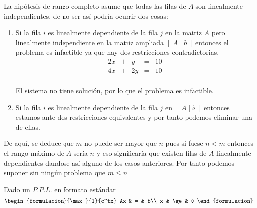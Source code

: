 La hipótesis de rango completo asume que todas las filas de $A$ son
linealmente independientes. de no ser así podría ocurrir dos cosas:

\begin{enumerate}
  \item Si la fila $i$ es linealmente dependiente de la fila $j$ en la
  matriz $A$ pero linealmente independiente en la matriz ampliada
  $[\;A\;|\;b\;]$ entonces el problema es infactible ya  que hay dos
  restricciones contradictorias.
  $$
  \begin{array}{rrrrr}
    2x & + & y & = & 10\\
    4x & + & 2y & = & 10\\
  \end{array}
  $$
  
  El sistema no tiene solución, por lo que el problema es infactible.
  
  \item Si la fila $i$ es linealmente dependiente de  la fila $j$ en
  $[\;A\;|\;b\;]$ entonces estamos ante dos restricciones equivalentes
  y por tanto podemos eliminar una de ellas.
  
\end{enumerate}

De aquí, se deduce que $m$ no puede ser mayor que $n$ pues si fuese
$n<m$ entonces el rango máximo de $A$ sería $n$ y eso significaría que
existen filas de $A$ linealmente dependientes dandose así alguno de
los casos anteriores. Por tanto podemos suponer sin ningún problema
que $m\le n$.

Dado un $P.P.L.$ en formato estándar
$$
\begin{formulacion}{\max}{1}{c^tx}
  Ax & = & b\\
  x & \ge & 0
\end{formulacion}
$$

